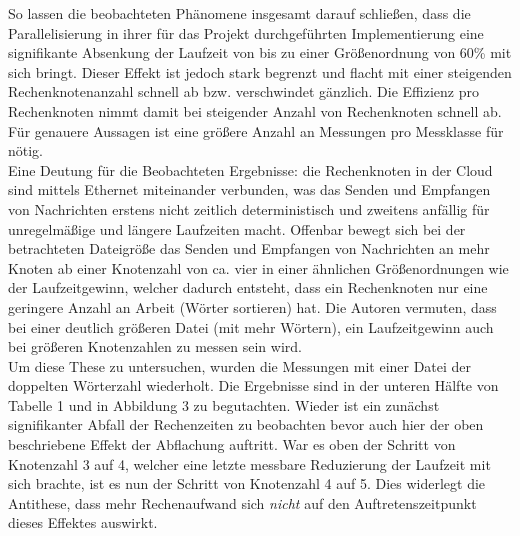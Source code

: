 So lassen die beobachteten Phänomene insgesamt darauf schließen, dass die Parallelisierung in ihrer für das Projekt durchgeführten Implementierung eine signifikante Absenkung der Laufzeit von bis zu einer Größenordnung von 60\% mit sich bringt. Dieser Effekt ist jedoch stark begrenzt und flacht mit einer steigenden Rechenknotenanzahl schnell ab bzw. verschwindet gänzlich. Die Effizienz pro Rechenknoten nimmt damit bei steigender Anzahl von Rechenknoten schnell ab.
Für genauere Aussagen ist eine größere Anzahl an Messungen pro Messklasse für nötig.
\\
Eine Deutung für die Beobachteten Ergebnisse: die Rechenknoten in der Cloud sind mittels Ethernet miteinander verbunden, was das Senden und Empfangen von Nachrichten erstens nicht zeitlich deterministisch und zweitens anfällig für unregelmäßige und längere Laufzeiten macht. Offenbar bewegt sich bei der betrachteten Dateigröße das Senden und Empfangen von Nachrichten an mehr Knoten ab einer Knotenzahl von ca. vier in einer ähnlichen Größenordnungen wie der Laufzeitgewinn, welcher dadurch entsteht, dass ein Rechenknoten nur eine geringere Anzahl an Arbeit (Wörter sortieren) hat. Die Autoren vermuten, dass bei einer deutlich größeren Datei (mit mehr Wörtern), ein Laufzeitgewinn auch bei größeren Knotenzahlen zu messen sein wird.
\\
Um diese These zu untersuchen, wurden die Messungen mit einer Datei der doppelten Wörterzahl wiederholt. Die Ergebnisse sind in der unteren Hälfte von Tabelle 1 und in Abbildung 3 zu begutachten. Wieder ist ein zunächst signifikanter Abfall der Rechenzeiten zu beobachten bevor auch hier der oben beschriebene Effekt der Abflachung auftritt. War es oben der Schritt von Knotenzahl 3 auf 4, welcher eine letzte messbare Reduzierung der Laufzeit mit sich brachte, ist es nun der Schritt von Knotenzahl 4 auf 5. Dies widerlegt die Antithese, dass mehr Rechenaufwand sich \textit{nicht} auf den Auftretenszeitpunkt dieses Effektes auswirkt.
\\
